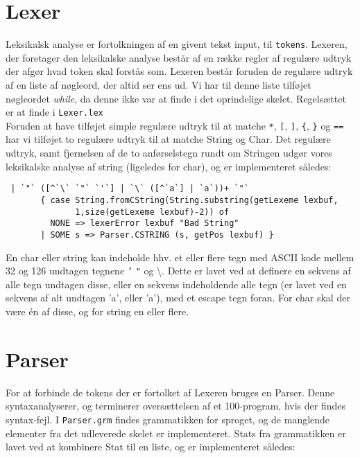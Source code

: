 \documentclass[12pt]{article}
\begin{document}
\section{Lexer}
Leksikalsk analyse er fortolkningen af en givent tekst input, til
\texttt{tokens}. Lexeren, der foretager den leksikalske analyse består af en
række regler af regulære udtryk der afgør hvad token skal forstås som. Lexeren
består foruden de regulære udtryk af en liste af nøgleord, der altid ser ens ud.
Vi har til denne liste tilføjet nøgleordet \textit{while}, da denne ikke var at
finde i det oprindelige skelet. Regelsættet er at finde i \texttt{Lexer.lex}\\
Foruden at have tilføjet simple regulære udtryk til at matche \texttt{*},
\texttt{[}, \texttt{]}, \texttt{\{}, \texttt{\}} og \texttt{==} har vi
tilføjet to regulære udtryk til at matche String og Char. Det regulære udtryk,
samt fjernelsen af de to anførselstegn rundt om Stringen udgør vores leksikalske
analyse af string (ligeledes for char), og er implementeret således:\\

\begin{verbatim}
 | `"` ([^`\` `"` `'`] | `\` ([^`a`] | `a`))+ `"`
       { case String.fromCString(String.substring(getLexeme lexbuf,
              1,size(getLexeme lexbuf)-2)) of
         NONE => lexerError lexbuf "Bad String"
       | SOME s => Parser.CSTRING (s, getPos lexbuf) }
\end{verbatim}	 
    
En char eller string kan indeholde hhv. et eller flere tegn med ASCII kode
mellem 32 og 126 undtagen tegnene \texttt{’} \texttt{"} og \textbackslash. Dette er lavet ved at definere en
sekvens af alle tegn undtagen disse, eller en sekvens indeholdende alle tegn (er
lavet ved en sekvens af alt undtagen 'a', eller 'a'), med et escape tegn foran.
For char skal der være én af disse, og for string en eller flere.
    
    
\section{Parser}
For at forbinde de tokens der er fortolket af Lexeren bruges en Parser. Denne
syntaxanalyserer, og terminerer oversættelsen af et 100-program, hvis der findes
syntax-fejl. I \texttt{Parser.grm} findes grammatikken for sproget, og de
manglende elementer fra det udleverede skelet er implementeret. Stats fra
grammatikken er lavet ved at kombinere Stat til en liste, og er implementeret
således:\\
\end{document}
